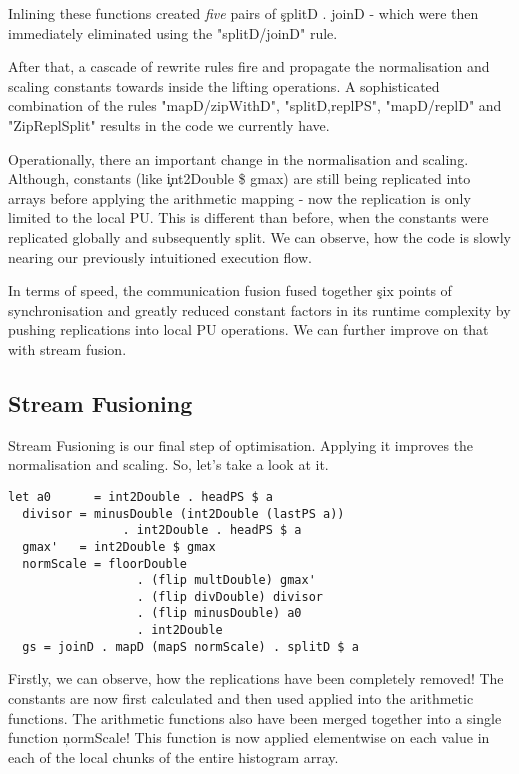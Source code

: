     Inlining these functions created \emph{five} pairs of \c{splitD . joinD} - which were then immediately
    eliminated using the "splitD/joinD" rule.
    
    After that, a cascade of rewrite rules fire and propagate the normalisation and scaling
    constants towards inside the lifting operations. A sophisticated combination of the rules
    "mapD/zipWithD", "splitD,replPS", "mapD/replD" and "ZipReplSplit" results in
    the code we currently have.
    
    Operationally, there an important change in the normalisation and scaling.
    Although, constants (like \c{int2Double \$ gmax}) are still being replicated into arrays
    before applying the arithmetic mapping - now the replication
    is only limited to the local PU. This is different than before, when
    the constants were replicated globally and subsequently split.
    We can observe, how the code is slowly nearing our previously intuitioned execution flow.
    
    
    In terms of speed, the communication fusion fused together \c{six} points of synchronisation
    and greatly reduced constant factors in its runtime complexity by pushing
    replications into local PU operations. We can further improve on that with stream fusion.
    
  \subsection{Stream Fusioning}
    Stream Fusioning is our final step of optimisation. Applying it improves
    the normalisation and scaling. So, let's take a look at it.
    \begin{lstlisting}
let a0      = int2Double . headPS $ a 
  divisor = minusDouble (int2Double (lastPS a))
                . int2Double . headPS $ a
  gmax'   = int2Double $ gmax
  normScale = floorDouble
                  . (flip multDouble) gmax'
                  . (flip divDouble) divisor
                  . (flip minusDouble) a0
                  . int2Double
  gs = joinD . mapD (mapS normScale) . splitD $ a
     \end{lstlisting}
     Firstly, we can observe, how the replications have been completely removed! The
     constants are now first calculated and then used applied into the
     arithmetic functions. The arithmetic functions also have been merged together into
     a single function \c{normScale}! This function is now applied elementwise
     on each value in each of the local chunks of the entire histogram array.
     

